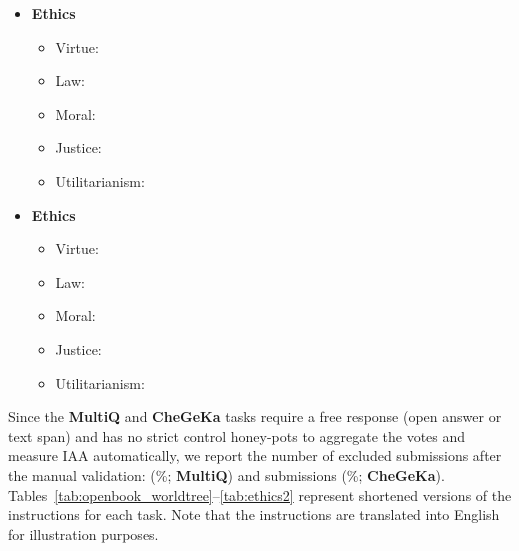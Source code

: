 \documentclass[11pt]{article}
\begin{document}
\begin{itemize}\item \textbf{Ethics}
    \begin{itemize}\item Virtue: \item Law: \item Moral: \item Justice: \item Utilitarianism: \end{itemize}
    
    \item \textbf{Ethics}
    \begin{itemize}\item Virtue: \item Law: \item Moral: \item Justice: \item Utilitarianism: \end{itemize}
\end{itemize}

Since the \textbf{MultiQ} and \textbf{CheGeKa} tasks require a free response (open answer or text span) and has no strict control honey-pots to aggregate the votes and measure IAA automatically, we report the number of excluded submissions after the manual validation:  (\%; \textbf{MultiQ}) and  submissions (\%; \textbf{CheGeKa}). Tables~\ref{tab:openbook_worldtree}--\ref{tab:ethics2} represent shortened versions of the instructions for each task. Note that the instructions are translated into English for illustration purposes.
\end{document}
